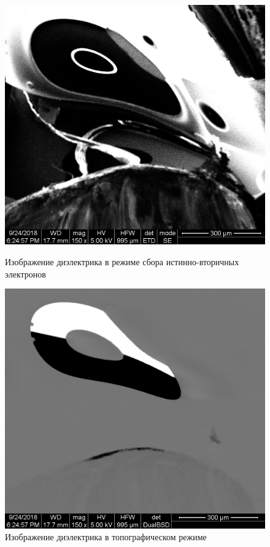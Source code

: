 \documentclass[a4paper, 12pt]{article}
\begin{document}
	\begin{figure}[!htb]
		\includegraphics[width=\linewidth]{iv_006.jpg}
		\caption{Изображение диэлектрика в режиме сбора истинно-вторичных электронов}
		\label{fig:iv_006}
		\endminipage\hfill
		\includegraphics[width=\linewidth]{topo_005.tif}
		\caption{Изображение диэлектрика в топографическом режиме}
		\label{fig:topo_005}
		\endminipage
	\end{figure}
\end{document}
